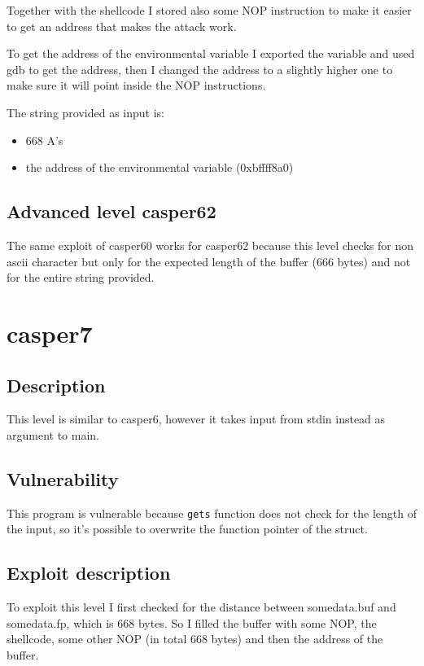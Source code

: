 \documentclass[a4paper,12pt]{article}
\begin{document}
Together with the shellcode I stored also some NOP instruction to make it easier to get an address that makes the attack work.

To get the address of the environmental variable I exported the variable and used gdb to get the address, then I changed the address to a slightly higher one to make sure it will point inside the NOP instructions.

The string provided as input is:
\begin{itemize}
\item 668 A's
\item the address of the environmental variable (0xbffff8a0)
\end{itemize}

\subsection{Advanced level casper62}

The same exploit of casper60 works for casper62 because this level checks for non ascii character but only for the expected length of the buffer (666 bytes) and not for the entire string provided.
\section{casper7}
\subsection{Description}
This level is similar to casper6, however it takes input from stdin instead as argument to main.


\subsection{Vulnerability}
This program is vulnerable because \texttt{gets} function does not check for the length of the input, so it's possible to overwrite the function pointer of the struct.

\subsection{Exploit description} 

To exploit this level I first checked for the distance between somedata.buf and somedata.fp, which is 668 bytes.
So I filled the buffer with some NOP, the shellcode, some other NOP (in total 668 bytes) and then the address of the buffer.
\end{document}
